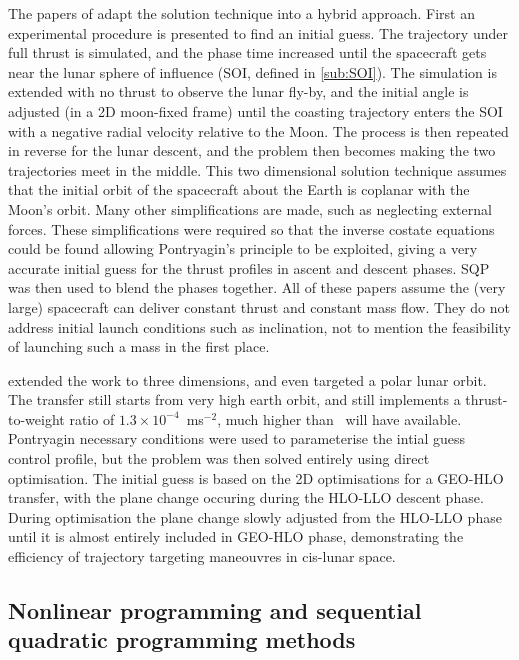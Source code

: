 The papers of \textcite{Kluever1995, Kluever1996} adapt the solution technique into a hybrid approach. First an experimental procedure is presented to find an initial guess. The trajectory under full thrust is simulated, and the phase time increased until the spacecraft gets near the lunar sphere of influence (SOI, defined in \autoref{sub:SOI}). The simulation is extended with no thrust to observe the lunar fly-by, and the initial angle is adjusted (in a 2D moon-fixed frame) until the coasting trajectory enters the SOI with a negative radial velocity relative to the Moon. The process is then repeated in reverse for the lunar descent, and the problem then becomes making the two trajectories meet in the middle. This two dimensional solution technique assumes that the initial orbit of the spacecraft about the Earth is coplanar with the Moon's orbit. Many other simplifications are made, such as neglecting external forces. These simplifications were required so that the inverse costate equations could be found allowing Pontryagin's principle to be exploited, giving a very accurate initial guess for the thrust profiles in ascent and descent phases. SQP was then used to blend the phases together. All of these papers assume the (very large) spacecraft can deliver constant thrust and constant mass flow. They do not address initial launch conditions such as inclination, not to mention the feasibility of launching such a mass in the first place.

\textcite{Kluever1997} extended the work to three dimensions, and even targeted a polar lunar orbit. The transfer still starts from very high earth orbit, and still implements a thrust-to-weight ratio of $1.3\times10^{-4}$~ms$^{-2}$, much higher than \BW\ will have available. Pontryagin necessary conditions were used to parameterise the intial guess control profile, but the problem was then solved entirely using direct optimisation. The initial guess is based on the 2D optimisations for a GEO-HLO transfer, with the plane change occuring during the HLO-LLO descent phase. During optimisation the plane change slowly adjusted from the HLO-LLO phase until it is almost entirely included in GEO-HLO phase, demonstrating the efficiency of trajectory targeting maneouvres in cis-lunar space.





\subsection{Nonlinear programming and sequential quadratic programming methods} \label{sub:NLP-lit}

